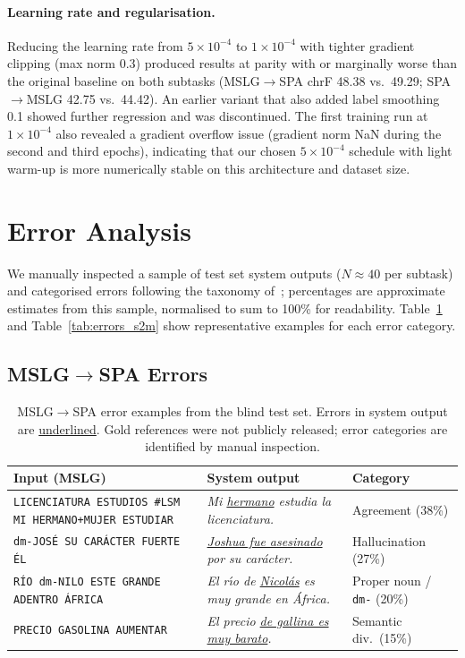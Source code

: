 \documentclass[sigconf,screen]{ceurart}
\begin{document}
\paragraph{Learning rate and regularisation.}
Reducing the learning rate from $5 \times 10^{-4}$ to
$1 \times 10^{-4}$ with tighter gradient clipping (max norm 0.3)
produced results at parity with or marginally worse than the original
baseline on both subtasks (MSLG$\!\to\!$SPA chrF 48.38 vs.\ 49.29;
SPA$\!\to\!$MSLG 42.75 vs.\ 44.42).
An earlier variant that also added label smoothing 0.1 showed further
regression and was discontinued.
The first training run at $1 \times 10^{-4}$ also revealed a gradient
overflow issue (gradient norm NaN during the second and third epochs),
indicating that our chosen $5 \times 10^{-4}$ schedule
with light warm-up is more numerically stable on this architecture
and dataset size.

\section{Error Analysis}
\label{sec:analysis}

We manually inspected a sample of test set system outputs ($N \approx 40$
per subtask) and categorised errors following the taxonomy
of~\cite{wslp2025}; percentages are approximate estimates from this
sample, normalised to sum to 100\% for readability.
Table~\ref{tab:errors_m2s} and Table~\ref{tab:errors_s2m} show
representative examples for each error category.

\subsection{MSLG$\!\to\!$SPA Errors}

\begin{table}[h]
\centering
\small
\caption{MSLG$\!\to\!$SPA error examples from the blind test set.
  Errors in system output are \underline{underlined}.
  Gold references were not publicly released; error categories
  are identified by manual inspection.}
\label{tab:errors_m2s}
\begin{tabular}{p{5cm}p{7cm}p{2.5cm}}
\toprule
\textbf{Input (MSLG)} & \textbf{System output} & \textbf{Category} \\
\midrule
\texttt{LICENCIATURA ESTUDIOS \#LSM MI HERMANO+MUJER ESTUDIAR} &
  \textit{Mi \underline{hermano} estudia la licenciatura.} &
  Agreement (38\%) \\
\midrule
\texttt{dm-JOS\'E SU CAR\'ACTER FUERTE \'EL} &
  \textit{\underline{Joshua fue asesinado} por su car\'acter.} &
  Hallucination (27\%) \\
\midrule
\texttt{R\'IO dm-NILO ESTE GRANDE ADENTRO \'AFRICA} &
  \textit{El r\'{\i}o de \underline{Nicol\'as} es muy grande en \'Africa.} &
  Proper noun / \texttt{dm-} (20\%) \\
\midrule
\texttt{PRECIO GASOLINA AUMENTAR} &
  \textit{El precio \underline{de gallina es muy barato}.} &
  Semantic div.\ (15\%) \\
\bottomrule
\end{tabular}
\end{table}
\end{document}
